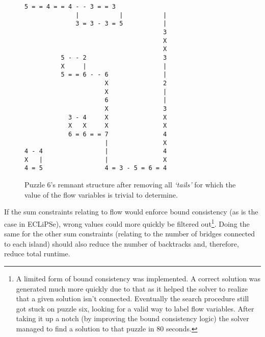 \begin{figure}[H]
\centering
\begin{BVerbatim}[fontsize=\footnotesize]
              5 = = 4 = = 4 - - 3 = = 3
              |           |           |
              3 = 3 - 3 = 5           |
                                      3
                                      X
                                      X
          5 - - 2                     3
          X     |                     |
          5 = = 6 - - 6               |
                      X               2
                      X               |
                      6               |
                      X               3
            3 - 4     X               X
            X   X     X               X
            6 = 6 = = 7               4
                      |               X
4 - 4                 |               4
X   |                 |               X
4 = 5                 4 = 3 - 5 = 6 = 4
\end{BVerbatim}
\caption{Puzzle 6's remnant structure after removing all \textit{`tails'} for which the value of the flow variables is trivial to determine.}
\label{fig:circles}
\end{figure}

If the sum constraints relating to flow would enforce bound consistency (as is the case in ECLiPSe), wrong values could more quickly be filtered out\footnote{A limited form of bound consistency was implemented. A correct solution was generated much more quickly due to that as it helped the solver to realize that a given solution isn't connected. Eventually the search procedure still got stuck on puzzle six, looking for a valid way to label flow variables. After taking it up a notch (by improving the bound consistency logic) the solver managed to find a solution to that puzzle in 80 seconds.}. Doing the same for the other sum constraints (relating to the number of bridges connected to each island) should also reduce the number of backtracks and, therefore, reduce total runtime.